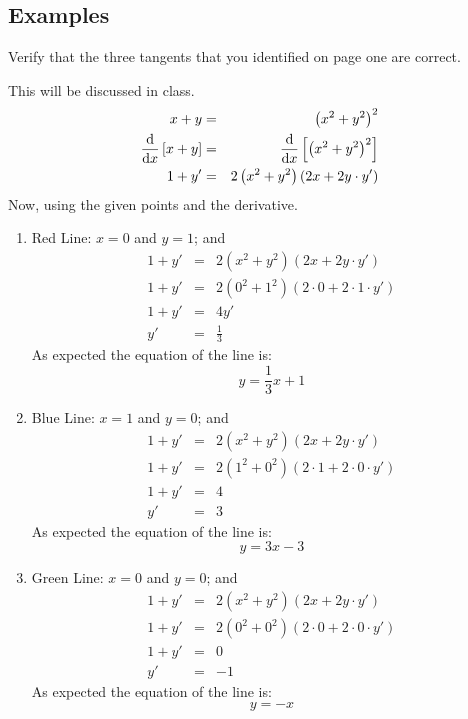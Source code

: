 \documentclass[12pt,addpoints, answers, fleqn]{exam}
\begin{document}
\subsection{Examples}
\begin{questions}


\question Verify that the three tangents that you identified on page one are correct.
\begin{solution}
This will be discussed in class.
\begin{eqnarray*}
x+y &=& \left( x^2 + y^2 \right)^2\\
\frac{{\rm{d}}}{{\rm{d}}x} \left[  x+y \right] &=& \frac{{\rm{d}}}{{\rm{d}}x} \left[  \left( x^2 + y^2 \right)^2 \right]\\
1+y' &=& 2 \left( x^2 + y^2 \right) \left( 2x + 2y \cdot y' \right)
\end{eqnarray*}
Now, using the given points and the derivative.
\begin{enumerate}
\item Red Line: $x=0$ and $y=1$; and
\begin{eqnarray*}
1+y' &=& 2 \left( x^2 + y^2 \right) \left( 2x + 2y \cdot y' \right)\\
1+y' &=& 2 \left( 0^2 + 1^2 \right) \left( 2 \cdot 0 + 2 \cdot 1  \cdot y' \right)\\
1+y' &=& 4 y'\\
y' &=& \frac{1}{3}
\end{eqnarray*}
As expected the equation of the line is:
\[
y = \frac{1}{3}x + 1
\]
\item Blue Line: $x=1$ and $y=0$; and
\begin{eqnarray*}
1+y' &=& 2 \left( x^2 + y^2 \right) \left( 2x + 2y \cdot y' \right)\\
1+y' &=& 2 \left( 1^2 + 0^2 \right) \left( 2 \cdot 1 + 2 \cdot 0  \cdot y' \right)\\
1+y' &=& 4\\
y' &=& 3
\end{eqnarray*}
As expected the equation of the line is:
\[
y = 3x -3
\]
\item Green Line: $x=0$ and $y=0$; and
\begin{eqnarray*}
1+y' &=& 2 \left( x^2 + y^2 \right) \left( 2x + 2y \cdot y' \right)\\
1+y' &=& 2 \left( 0^2 + 0^2 \right) \left( 2 \cdot 0 + 2 \cdot 0  \cdot y' \right)\\
1+y' &=& 0\\
y' &=& -1
\end{eqnarray*}
As expected the equation of the line is:
\[
y = -x
\]
\end{enumerate}
\end{solution}



\end{questions}
\end{document}
